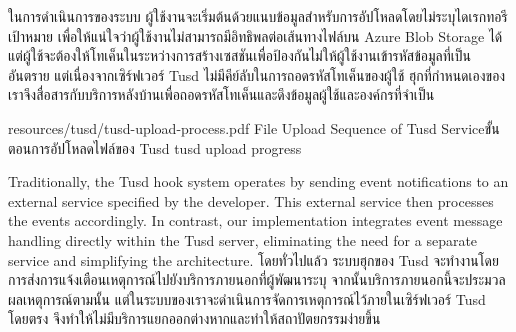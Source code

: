ในการดำเนินการของระบบ ผู้ใช้งานจะเริ่มต้นด้วยแนบข้อมูลสำหรับการอัปโหลดโดยไม่ระบุไดเรกทอรีเป้าหมาย เพื่อให้แน่ใจว่าผู้ใช้งานไม่สามารถมีอิทธิพลต่อเส้นทางไฟล์บน Azure Blob Storage ได้ แต่ผู้ใช้จะต้องให้โทเค็นในระหว่างการสร้างเซสชันเพื่อป้องกันไม่ให้ผู้ใช้งานเข้ารหัสข้อมูลที่เป็นอันตราย แต่เนื่องจากเซิร์ฟเวอร์ Tusd ไม่มีคีย์ลับในการถอดรหัสโทเค็นของผู้ใช้ ฮุกที่กำหนดเองของเราจึงสื่อสารกับบริการหลังบ้านเพื่อถอดรหัสโทเค็นและดึงข้อมูลผู้ใช้และองค์กรที่จำเป็น
\fi

\insertPDFfigure
{resources/tusd/tusd-upload-process.pdf}
{\ifenglish File Upload Sequence of Tusd Service\else ขั้นตอนการอัปโหลดไฟล์ของ Tusd\fi}
{tusd upload progress}

\ifenglish
Traditionally, the Tusd hook system operates by sending event notifications to an external service specified by the developer. This external service then processes the events accordingly. In contrast, our implementation integrates event message handling directly within the Tusd server, eliminating the need for a separate service and simplifying the architecture.
\else
โดยทั่วไปแล้ว ระบบฮุกของ Tusd จะทำงานโดยการส่งการแจ้งเตือนเหตุการณ์ไปยังบริการภายนอกที่ผู้พัฒนาระบุ จากนั้นบริการภายนอกนี้จะประมวลผลเหตุการณ์ตามนั้น แต่ในระบบของเราจะดำเนินการจัดการเหตุการณ์ไว้ภายในเซิร์ฟเวอร์ Tusd โดยตรง จึงทำให้ไม่มีบริการแยกออกต่างหากและทำให้สถาปัตยกรรมง่ายขึ้น
\fi